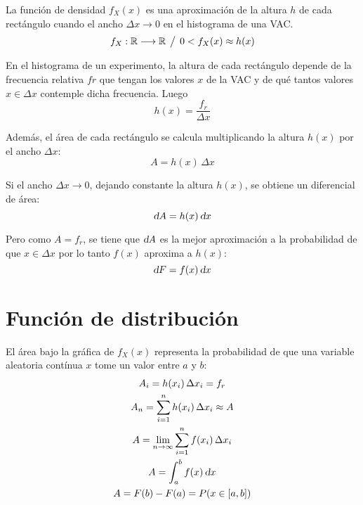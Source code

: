 \documentclass[a5paper,12pt,twoside]{book}
\begin{document}
La función de densidad $f_X(x)$ es una aproximación de la altura $h$ de cada rectángulo cuando el ancho $\Delta x \to 0$ en el histograma de una VAC.
\begin{equation*}
    f_X: \mathbb{R} \longrightarrow \mathbb{R} \hspace{1ex} \big/ \hspace{1ex} 0 < f_X(x) \approx h(x)
\end{equation*}

En el histograma de un experimento, la altura de cada rectángulo depende de la frecuencia relativa $fr$ que tengan los valores $x$ de la VAC y de qué tantos valores $x \in \Delta x$ contemple dicha frecuencia.
Luego
\begin{equation*}
    h(x) = \frac{f_r}{\Delta x}
\end{equation*}

Además, el área de cada rectángulo se calcula multiplicando la altura $h(x)$ por el ancho $\Delta x$:
\begin{equation*}
    A = h(x) \, \Delta x
\end{equation*}

Si el ancho $\Delta x \to 0$, dejando constante la altura $h(x)$, se obtiene un diferencial de área:
\begin{equation*}
    \textsl{d} A = h(x) \, \textsl{d} x
\end{equation*}

Pero como $A=f_r$, se tiene que $\textsl{d} A$ es la mejor aproximación a la probabilidad de que $x \in \Delta x$ por lo tanto $f(x)$ aproxima a $h(x)$:
\begin{equation*}
    \textsl{d} F = f(x) \, \textsl{d} x
\end{equation*}


\section{Función de distribución}

El área bajo la gráfica de $f_X(x)$ representa la probabilidad de que una variable aleatoria contínua $x$ tome un valor entre $a$ y $b$:
\begin{gather*}
    A_i = h(x_i) \, \Delta x_i = f_r
    \\
    A_n = \sum_{i=1}^n h(x_i) \, \Delta x_i \approx A
    \\
    A = \lim_{n \to \infty} \sum_{i=1}^n f(x_i) \, \Delta x_i
    \\
    A = \int_a^b f(x) \, \textsl{d} x
    \\
    A = F(b) - F(a) = P(x \in [a,b])
\end{gather*}
\end{document}
